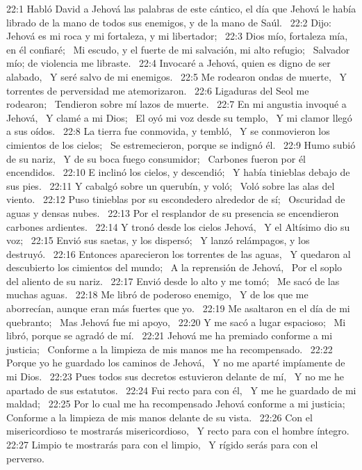22:1 Habló David a Jehová las palabras de este cántico, el día que Jehová le había librado de la mano de todos sus enemigos, y de la mano de Saúl.  
22:2 Dijo:  
Jehová es mi roca y mi fortaleza, y mi libertador;  
22:3 Dios mío, fortaleza mía, en él confiaré;  
Mi escudo, y el fuerte de mi salvación, mi alto refugio;  
Salvador mío; de violencia me libraste.  
22:4 Invocaré a Jehová, quien es digno de ser alabado,  
Y seré salvo de mi enemigos.  
22:5 Me rodearon ondas de muerte,  
Y torrentes de perversidad me atemorizaron.  
22:6 Ligaduras del Seol me rodearon;  
Tendieron sobre mí lazos de muerte.  
22:7 En mi angustia invoqué a Jehová,  
Y clamé a mi Dios;  
El oyó mi voz desde su templo,  
Y mi clamor llegó a sus oídos.  
22:8 La tierra fue conmovida, y tembló,  
Y se conmovieron los cimientos de los cielos;  
Se estremecieron, porque se indignó él.  
22:9 Humo subió de su nariz,  
Y de su boca fuego consumidor;  
Carbones fueron por él encendidos.  
22:10 E inclinó los cielos, y descendió;  
Y había tinieblas debajo de sus pies.  
22:11 Y cabalgó sobre un querubín, y voló;  
Voló sobre las alas del viento.  
22:12 Puso tinieblas por su escondedero alrededor de sí;  
Oscuridad de aguas y densas nubes.  
22:13 Por el resplandor de su presencia se encendieron carbones ardientes.  
22:14 Y tronó desde los cielos Jehová,  
Y el Altísimo dio su voz;  
22:15 Envió sus saetas, y los dispersó;  
Y lanzó relámpagos, y los destruyó.  
22:16 Entonces aparecieron los torrentes de las aguas,  
Y quedaron al descubierto los cimientos del mundo;  
A la reprensión de Jehová,  
Por el soplo del aliento de su nariz.  
22:17 Envió desde lo alto y me tomó;  
Me sacó de las muchas aguas.  
22:18 Me libró de poderoso enemigo,  
Y de los que me aborrecían, aunque eran más fuertes que yo.  
22:19 Me asaltaron en el día de mi quebranto;  
Mas Jehová fue mi apoyo,  
22:20 Y me sacó a lugar espacioso;  
Mi libró, porque se agradó de mí.  
22:21 Jehová me ha premiado conforme a mi justicia;  
Conforme a la limpieza de mis manos me ha recompensado.  
22:22 Porque yo he guardado los caminos de Jehová,  
Y no me aparté impíamente de mi Dios.  
22:23 Pues todos sus decretos estuvieron delante de mí,  
Y no me he apartado de sus estatutos.  
22:24 Fui recto para con él,  
Y me he guardado de mi maldad;  
22:25 Por lo cual me ha recompensado Jehová conforme a mi justicia;  
Conforme a la limpieza de mis manos delante de su vista.  
22:26 Con el misericordioso te mostrarás misericordioso,  
Y recto para con el hombre íntegro.  
22:27 Limpio te mostrarás para con el limpio,  
Y rígido serás para con el perverso.  
